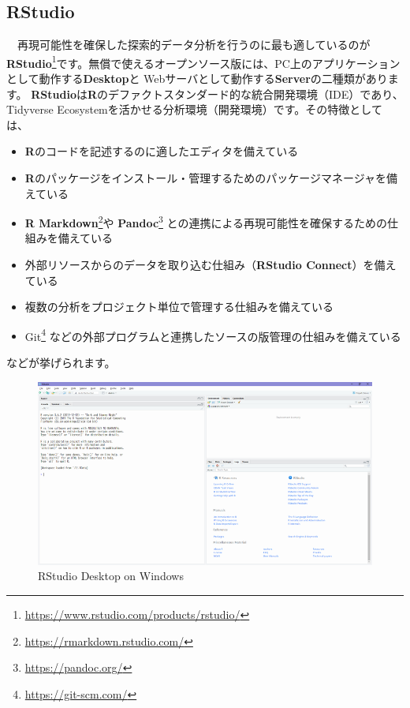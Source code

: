 \documentclass[
  12pt,
]{book}
\DeclareRobustCommand{\href}[2]{#2\footnote{\url{#1}}}
\providecommand{\tightlist}{%
  \setlength{\itemsep}{0pt}\setlength{\parskip}{0pt}}
\begin{document}
\hypertarget{rstudio}{%
\subsection{\texorpdfstring{RStudio}{RStudio}}\label{rstudio}}

　再現可能性を確保した探索的データ分析を行うのに最も適しているのが\href{https://www.rstudio.com/products/rstudio/}{\textbf{RStudio}}です。無償で使えるオープンソース版には、PC上のアプリケーションとして動作する\textbf{Desktop}と Webサーバとして動作する\textbf{Server}の二種類があります。 \textbf{RStudio}は\textbf{R}のデファクトスタンダード的な統合開発環境（IDE）であり、Tidyverse Ecosystemを活かせる分析環境（開発環境）です。その特徴としては、

\begin{itemize}
\tightlist
\item
  \textbf{R}のコードを記述するのに適したエディタを備えている
\item
  \textbf{R}のパッケージをインストール・管理するためのパッケージマネージャを備えている
\item
  \href{https://rmarkdown.rstudio.com/}{\textbf{R Markdown}}や \href{https://pandoc.org/}{\textbf{Pandoc}} との連携による再現可能性を確保するための仕組みを備えている
\item
  外部リソースからのデータを取り込む仕組み（\textbf{RStudio Connect}）を備えている
\item
  複数の分析をプロジェクト単位で管理する仕組みを備えている
\item
  \href{https://git-scm.com/}{Git} などの外部プログラムと連携したソースの版管理の仕組みを備えている
\end{itemize}

などが挙げられます。

\begin{figure}[H]

{\centering \includegraphics[width=0.9\linewidth,]{./fig/RStudio/DT} 

}

\caption{RStudio Desktop on Windows}\label{fig:unnamed-chunk-23}
\end{figure}
\end{document}
